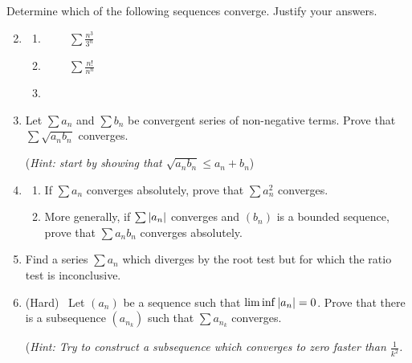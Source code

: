 \begin{exercisessec}{}{}
	\exstart %
	Determine which of the following sequences converge. Justify your answers.\vspace{-2pt}
	\begin{enumerate}\setcounter{enumi}{1}
    \item[]\begin{enumerate}
			\item {} \   \  \ $\sum\frac{n^3}{3^n}$
			\setcounter{enumii}{4}
			\item {} \   \  \ $\sum\frac{n!}{n^n}$
			\setcounter{enumii}{8}
			\item {} \  
		\end{enumerate}
		
  
	   \item%
	   Let $\sum a_n$ and $\sum b_n$ be convergent series of non-negative terms. Prove that $\sum \sqrt{a_nb_n}$ converges.\par
	  	(\emph{Hint: start by showing that $\sqrt{a_nb_n}\le a_n+b_n$})
	  
  
  
	  \item%
	  \label{exs:seriesmult}
	  \begin{enumerate}
	    \item If $\sum a_n$ converges absolutely, prove that $\sum a_n^2$ converges.
	    \item More generally, if $\sum\left| a_n\right|$ converges and $(b_n)$ is a bounded sequence, prove that $\sum a_nb_n$ converges absolutely.
	  \end{enumerate}
	  
	  
	  \item%
		Find a series $\sum a_n$ which diverges by the root test but for which the ratio test is inconclusive.
	  
	  \item%
	  (Hard) \ Let $(a_n)$ be a sequence such that $\liminf\left| a_n\right|=0$. Prove that there is a subsequence $(a_{n_k})$ such that $\sum a_{n_k}$ converges.\par
	  (\emph{Hint: Try to construct a subsequence which converges to zero faster than $\frac 1{k^2}$.}
	  

\end{enumerate}
\end{exercisessec}
